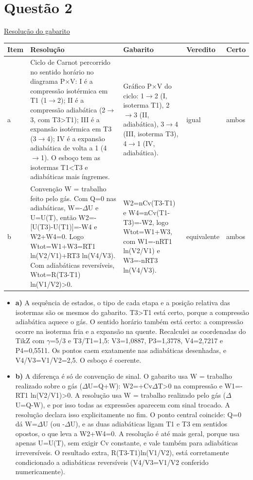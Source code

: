\documentclass{article}%
\begin{document}
\section*{Questão 2}%
\href{https://poliedroresolve.sistemapoliedro.com.br/vestibulares/ime/2027/ime-2-fase-dia-3-28-10-2026-2-fase-dia-3/dissertativa-2-quimica-2-fase-dia-3-ime-2027}{Resolução do gabarito}\par\smallskip%
\begin{longtable}{@{}p{} p{} p{} p{} p{}@{}}\toprule Item & Resolução & Gabarito & Veredito & Certo \\ \midrule
a & Ciclo de Carnot percorrido no sentido horário no diagrama P$\times$V: I é a compressão isotérmica em T1 (1$\to$2); II é a compressão adiabática (2$\to$3, com T3>T1); III é a expansão isotérmica em T3 (3$\to$4); IV é a expansão adiabática de volta a 1 (4$\to$1). O esboço tem as isotermas T1<T3 e adiabáticas mais íngremes. & Gráfico P$\times$V do ciclo: 1$\to$2 (I, isoterma T1), 2$\to$3 (II, adiabática), 3$\to$4 (III, isoterma T3), 4$\to$1 (IV, adiabática). & igual & ambos \\
b & Convenção W = trabalho feito pelo gás. Com Q=0 nas adiabáticas, W=-$\Delta$U e U=U(T), então W2=-{[}U(T3)-U(T1){]}=-W4 e W2+W4=0. Logo Wtot=W1+W3=RT1 ln(V2/V1)+RT3 ln(V4/V3). Com adiabáticas reversíveis, Wtot=R(T3-T1) ln(V1/V2)>0. & W2=nCv(T3-T1) e W4=nCv(T1-T3)=-W2, logo Wtot=W1+W3, com W1=-nRT1 ln(V2/V1) e W3=-nRT3 ln(V4/V3). & equivalente & ambos \\
\bottomrule\end{longtable}%
\begin{itemize}%
\item%
\textbf{a)} A sequência de estados, o tipo de cada etapa e a posição relativa das isotermas são os mesmos do gabarito. T3>T1 está certo, porque a compressão adiabática aquece o gás. O sentido horário também está certo: a compressão ocorre na isoterma fria e a expansão na quente. Recalculei as coordenadas do TikZ com $\gamma$=5/3 e T3/T1=1,5: V3=1,0887, P3=1,3778, V4=2,7217 e P4=0,5511. Os pontos caem exatamente nas adiabáticas desenhadas, e V4/V3=V1/V2=2,5. O esboço é coerente.%
\item%
\textbf{b)} A diferença é só de convenção de sinal. O gabarito usa W = trabalho realizado sobre o gás ($\Delta$U=Q+W): W2=+Cv$\Delta$T>0 na compressão e W1=-RT1 ln(V2/V1)>0. A resolução usa W = trabalho realizado pelo gás ($\Delta$U=Q-W), e por isso todas as expressões aparecem com sinal trocado. A resolução declara isso explicitamente no fim. O ponto central coincide: Q=0 dá W=$\Delta$U (ou -$\Delta$U), e as duas adiabáticas ligam T1 e T3 em sentidos opostos, o que leva a W2+W4=0. A resolução é até mais geral, porque usa apenas U=U(T), sem exigir Cv constante, e vale também para adiabáticas irreversíveis. O resultado extra, R(T3-T1)ln(V1/V2), está corretamente condicionado a adiabáticas reversíveis (V4/V3=V1/V2 conferido numericamente).%
\end{itemize}%
\end{document}
